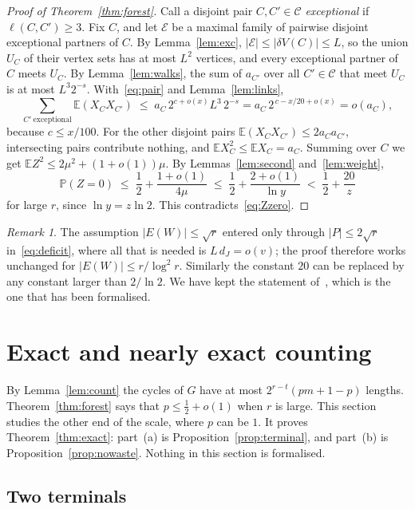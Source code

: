 \documentclass[11pt]{article}
\theoremstyle{definition}
\theoremstyle{remark}
\newtheorem{remark}[theorem]{Remark}
\newcommand{\PP}{\mathbb{P}}
\newcommand{\EE}{\mathbb{E}}
\newcommand{\half}{\tfrac12}
\begin{document}
\begin{proof}[Proof of Theorem~\ref{thm:forest}]
Call a disjoint pair $C,C'\in\mathcal{C}$ \emph{exceptional} if $\ell(C,C')\ge3$. Fix $C$, and let
$\mathcal{E}$ be a maximal family of pairwise disjoint exceptional partners of $C$. By
Lemma~\ref{lem:exc}, $|\mathcal{E}|\le|\delta V(C)|\le L$, so the union $U_C$ of their vertex sets
has at most $L^{2}$ vertices, and every exceptional partner of $C$ meets $U_C$. By
Lemma~\ref{lem:walks}, the sum of $a_{C'}$ over all $C'\in\mathcal{C}$ that meet $U_C$ is at most
$L^{3}2^{-s}$. With~\eqref{eq:pair} and Lemma~\ref{lem:links},
\[
  \sum_{C'\ \mathrm{exceptional}}\EE(X_CX_{C'})\;\le\;a_C\,2^{c+o(x)}L^{3}\,2^{-s}
  =a_C\,2^{\,c-x/20+o(x)}=o(a_C),
\]
because $c\le x/100$. For the other disjoint pairs $\EE(X_CX_{C'})\le2a_Ca_{C'}$, intersecting pairs
contribute nothing, and $\EE X_C^{2}\le\EE X_C=a_C$. Summing over $C$ we get
$\EE Z^{2}\le2\mu^{2}+(1+o(1))\mu$. By Lemmas~\ref{lem:second} and~\ref{lem:weight},
\[
  \PP(Z=0)\;\le\;\frac12+\frac{1+o(1)}{4\mu}\;\le\;\frac12+\frac{2+o(1)}{\ln y}\;<\;\frac12+\frac{20}{z}
\]
for large $r$, since $\ln y=z\ln2$. This contradicts~\eqref{eq:Zzero}.
\end{proof}

\begin{remark}\label{rem:range}
The assumption $|E(W)|\le\sqrt r$ entered only through $|P|\le2\sqrt r$ in~\eqref{eq:deficit}, where
all that is needed is $L\,d_J=o(v)$; the proof therefore works unchanged for
$|E(W)|\le r/\log^{2}r$. Similarly the constant $20$ can be replaced by any constant larger than
$2/\ln2$. We have kept the statement of~\cite{KNT}, which is the one that has been formalised.
\end{remark}
\section{Exact and nearly exact counting}\label{sec:exact}

By Lemma~\ref{lem:count} the cycles of $G$ have at most $2^{r-t}(pm+1-p)$ lengths.
Theorem~\ref{thm:forest} says that $p\le\half+o(1)$ when $r$ is large. This section studies the
other end of the scale, where $p$ can be $1$. It proves Theorem~\ref{thm:exact}: part~(a) is
Proposition~\ref{prop:terminal}, and part~(b) is Proposition~\ref{prop:nowaste}. Nothing in this
section is formalised.

\subsection{Two terminals}
\end{document}
